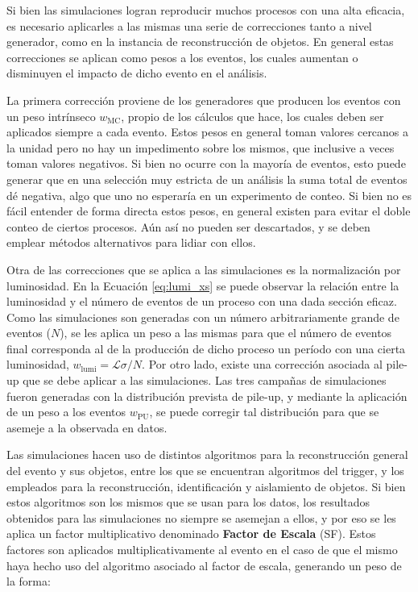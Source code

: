 Si bien las simulaciones logran reproducir muchos procesos con una alta eficacia, es necesario aplicarles a las mismas una serie de correcciones tanto a nivel generador, como en la instancia de reconstrucción de objetos. En general estas correcciones se aplican como pesos a los eventos, los cuales aumentan o disminuyen el impacto de dicho evento en el análisis.

La primera corrección proviene de los generadores que producen los eventos con un peso intrínseco $w_\text{MC}$, propio de los cálculos que hace, los cuales deben ser aplicados siempre a cada evento. Estos pesos en general toman valores cercanos a la unidad pero no hay un impedimento sobre los mismos, que inclusive a veces toman valores negativos. Si bien no ocurre con la mayoría de eventos, esto puede generar que en una selección muy estricta de un análisis la suma total de eventos dé negativa, algo que uno no esperaría en un experimento de conteo. Si bien no es fácil entender de forma directa estos pesos, en general existen para evitar el doble conteo de ciertos procesos. Aún así no pueden ser descartados, y se deben emplear métodos alternativos para lidiar con ellos.

Otra de las correcciones que se aplica a las simulaciones es la normalización por luminosidad. En la Ecuación \ref{eq:lumi_xs} se puede observar la relación entre la luminosidad y el número de eventos de un proceso con una dada sección eficaz. Como las simulaciones son generadas con un número arbitrariamente grande de eventos ($N$), se les aplica un peso a las mismas para que el número de eventos final corresponda al de la producción de dicho proceso un período con una cierta luminosidad, $w_\text{lumi}=\mathcal{L}\sigma/N$. Por otro lado, existe una corrección asociada al pile-up que se debe aplicar a las simulaciones. Las tres campañas de simulaciones fueron generadas con la distribución prevista de pile-up, y mediante la aplicación de un peso a los eventos $w_\text{PU}$, se puede corregir tal distribución para que se asemeje a la observada en datos.

Las simulaciones hacen uso de distintos algoritmos para la reconstrucción general del evento y sus objetos, entre los que se encuentran algoritmos del trigger, y los empleados para la reconstrucción, identificación y aislamiento de objetos. Si bien estos algoritmos son los mismos que se usan para los datos, los resultados obtenidos para las simulaciones no siempre se asemejan a ellos, y por eso se les aplica un factor multiplicativo denominado \textbf{Factor de Escala} (SF). Estos factores son aplicados multiplicativamente al evento en el caso de que el mismo haya hecho uso del algoritmo asociado al factor de escala, generando un peso de la forma: 



